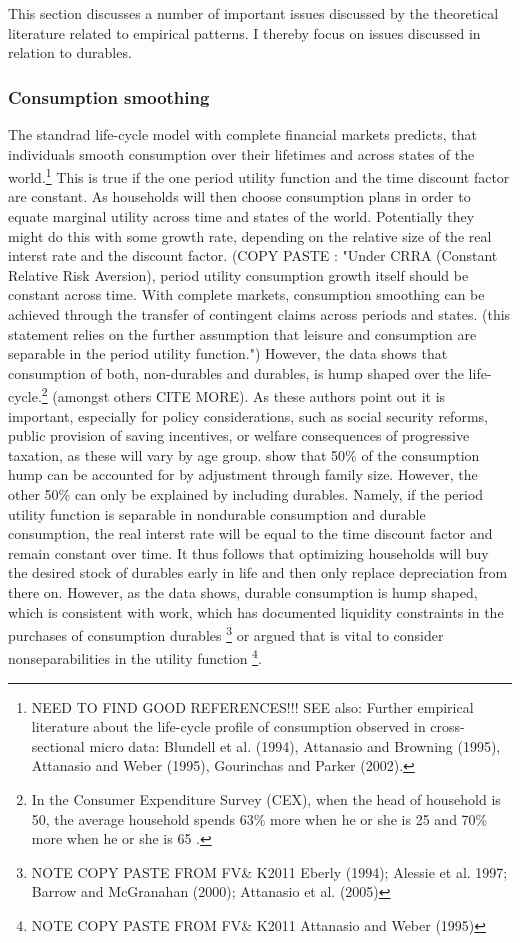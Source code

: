 \documentclass[a4paper,12pt,legno]{article}
\begin{document}
This section discusses a number of important issues discussed by the theoretical literature related to empirical patterns. I thereby focus on issues discussed in relation to durables. 

\subsubsection{Consumption smoothing}
The standrad life-cycle model with complete financial markets predicts, that individuals smooth consumption over their lifetimes and across states of the world.\footnote{NEED TO FIND GOOD REFERENCES!!! SEE also: Further empirical literature about the life-cycle profile of consumption observed in cross-sectional micro data: Blundell et al. (1994), Attanasio and Browning (1995), Attanasio and Weber (1995), Gourinchas and Parker (2002).  } This is true if the one period utility function and the time discount factor are constant. As  households will then choose consumption plans in order to equate marginal utility across time and states of the world. Potentially they might do this with some growth rate, depending on the relative size of the real interst rate and the discount factor. (COPY PASTE \citep{FV&K2011}: "Under CRRA (Constant Relative Risk Aversion), period utility consumption growth itself should be constant across time. With complete markets, consumption smoothing can be achieved through the transfer of contingent claims across periods and states. (this statement relies on the further assumption that leisure and consumption are separable in the period utility function.") However, the data shows that consumption of both, non-durables and durables, is hump shaped over the life-cycle.\footnote{In the Consumer Expenditure Survey (CEX), when the head of household is 50, the average household spends 63\% more when he or she is 25 and 70\% more when he or she is 65 \citep{FV&K2011}.} (amongst others CITE MORE). As these authors point out it is important, especially for policy considerations, such as social security reforms, public provision of saving incentives, or welfare consequences of progressive taxation, as these will vary by age group. \cite{FV&K2011} show that 50\% of the consumption hump can be accounted for by adjustment through family size. However, the other 50\% can only be explained by including durables. Namely, if the period utility function is separable in nondurable consumption and durable consumption, the real interst rate will be equal to the time discount factor and remain constant over time. It thus follows that optimizing households will buy the desired stock of durables early in life and then only replace depreciation from there on. However, as the data shows, durable consumption is hump shaped, which is consistent with work, which has documented liquidity constraints in the purchases of consumption durables \footnote{NOTE COPY PASTE FROM FV\& K2011 Eberly (1994); Alessie et al. 1997; Barrow and McGranahan (2000); Attanasio et al. (2005)} or argued that is vital to consider nonseparabilities in the utility function \footnote{NOTE COPY PASTE FROM FV\& K2011 Attanasio and Weber (1995)}.
\end{document}

